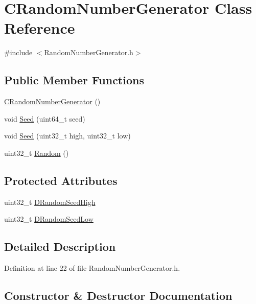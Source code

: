 \hypertarget{classCRandomNumberGenerator}{}\section{C\+Random\+Number\+Generator Class Reference}
\label{classCRandomNumberGenerator}


{\ttfamily \#include $<$Random\+Number\+Generator.\+h$>$}

\subsection*{Public Member Functions}
\begin{DoxyCompactItemize}
\item 
\hyperlink{classCRandomNumberGenerator_aca38d399d5d34b1fbe917aa4a2f5fd19}{C\+Random\+Number\+Generator} ()
\item 
void \hyperlink{classCRandomNumberGenerator_a9b6f52335ea93f1aaec4521c66806f39}{Seed} (uint64\+\_\+t seed)
\item 
void \hyperlink{classCRandomNumberGenerator_a2d7da1eb7f5886a113b0617276740f07}{Seed} (uint32\+\_\+t high, uint32\+\_\+t low)
\item 
uint32\+\_\+t \hyperlink{classCRandomNumberGenerator_aa7fc51bde5647d15df2f1b9826702ca2}{Random} ()
\end{DoxyCompactItemize}
\subsection*{Protected Attributes}
\begin{DoxyCompactItemize}
\item 
uint32\+\_\+t \hyperlink{classCRandomNumberGenerator_a450670f954d6ccb3cc39d7eebbf889c6}{D\+Random\+Seed\+High}
\item 
uint32\+\_\+t \hyperlink{classCRandomNumberGenerator_a33bf3bb9bc1378f4142932a01a3e2cfd}{D\+Random\+Seed\+Low}
\end{DoxyCompactItemize}


\subsection{Detailed Description}


Definition at line 22 of file Random\+Number\+Generator.\+h.



\subsection{Constructor \& Destructor Documentation}
\hypertarget{classCRandomNumberGenerator_aca38d399d5d34b1fbe917aa4a2f5fd19}{}\label{classCRandomNumberGenerator_aca38d399d5d34b1fbe917aa4a2f5fd19} 
